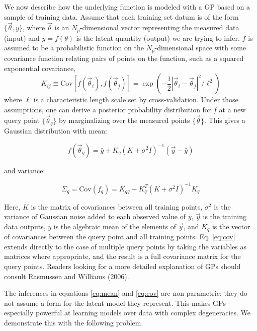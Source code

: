 \documentclass[useAMS,usenatbib,tightenlines,11pt,preprint]{aastex}
\begin{document}
We now describe how the underlying function is modeled with a GP based on a
sample of training data.  Assume that each training set datum is of the
form $\{\vec{\theta},y\}$, where $\vec{\theta}$ is an $N_p$-dimensional
vector representing the measured data (input) and $y = f(\theta)$ is the
latent quantity (output) we are trying to infer.  $f$ is assumed to be a
probabilistic function on the $N_p$-dimensional space with some covariance
function relating pairs of points on the function, such as a squared
exponential covariance,
\begin{equation}
\label{eq:covariogram}
K_{ij}\equiv\text{Cov}\left[f(\vec{\theta}_{i}),f(\vec{\theta}_{j})\right]
= \exp(-\frac{1}{2}|\vec{\theta}_{i} - \vec{\theta}_{j}|^2/\ell^2)
\end{equation}
where $\ell$
is a characteristic length scale set by cross-validation.  
Under those
assumptions, one can derive a posterior probability distribution for $f$
at a new query point $\{\vec{\theta}_{q}\}$ by marginalizing over
the measured points $\{\vec{\theta}\}$.  This gives a Gaussian distribution
with mean:

\begin{equation}
f(\vec{\theta}_q)=\bar{y}+K_q\left(K+\sigma^2 I\right)^{-1}(\vec{y}-\bar{y})
\label{eq:mean}
\end{equation}

\noindent
and variance:

\begin{equation}
\Sigma_{q} = \text{Cov}(f_{q}) = K_{qq} - K_q^T (K + \sigma^2I)^{-1} K_q
\label{eq:cov}
\end{equation}

\noindent
Here, $K$ is the matrix of
covariances between all training points, $\sigma^2$ is the variance of
Gaussian noise added to each observed value of $y$, $\vec{y}$
is the training data outputs, $\bar{y}$ is the algebraic mean of the elements of
$\vec{y}$, and
$K_q$ is the vector of covariances between the query point and all
training points.  Eq. \ref{eq:cov} extends directly to the case of multiple
query points by taking the variables as matrices where appropriate, and the
result is a full covariance matrix for the query points.  Readers looking
for a more detailed explanation of GPs should consult
Rasmussen and Williams (2006).


The inferences in equations \ref{eq:mean} and \ref{eq:cov} are non-parametric:
they do not assume a form for the latent model they represent.  This makes GPs
especially powerful at learning models over data
with complex degeneracies.  We demonstrate this with the following problem.
\end{document}
